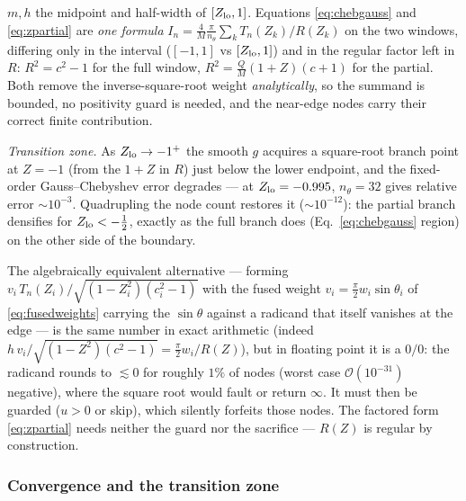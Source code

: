 \documentclass[11pt]{article}
\begin{document}
$m,h$ the midpoint and half-width of $[Z_{\rm lo},1]$.  Equations
\eqref{eq:chebgauss} and \eqref{eq:zpartial} are \emph{one formula}
$I_n=\tfrac{4}{M}\tfrac{\pi}{n_\theta}\sum_k T_n(Z_k)/R(Z_k)$ on the two
windows, differing only in the interval ($[-1,1]$ vs $[Z_{\rm lo},1]$) and in
the regular factor left in $R$: $R^{2}=c^{2}-1$ for the full window,
$R^{2}=\tfrac{Q}{M}(1+Z)(c+1)$ for the partial.  Both remove the
inverse-square-root weight \emph{analytically}, so the summand is bounded, no
positivity guard is needed, and the near-edge nodes carry their correct
finite contribution.

\emph{Transition zone.}  As $Z_{\rm lo}\to-1^{+}$ the smooth $g$ acquires a
square-root branch point at $Z=-1$ (from the $1+Z$ in $R$) just below the
lower endpoint, and the fixed-order Gauss--Chebyshev error degrades --- at
$Z_{\rm lo}=-0.995$, $n_\theta=32$ gives relative error $\sim10^{-3}$.
Quadrupling the node count restores it ($\sim10^{-12}$): the partial branch
densifies for $Z_{\rm lo}<-\tfrac12$, exactly as the full branch does
(Eq.~\ref{eq:chebgauss} region) on the other side of the boundary.

The algebraically equivalent alternative --- forming
$v_i\,T_n(Z_i)/\sqrt{(1-Z_i^{2})(c_i^{2}-1)}$ with the fused weight
$v_i=\tfrac\pi2 w_i\sin\theta_i$ of \eqref{eq:fusedweights} carrying the
$\sin\theta$ against a radicand that itself vanishes at the edge --- is the
same number in exact arithmetic (indeed $h\,v_i/\sqrt{(1-Z^2)(c^2-1)}
=\tfrac\pi2 w_i/R(Z)$), but in floating point it is a $0/0$: the radicand
rounds to $\lesssim0$ for roughly $1\%$ of nodes (worst case
$\mathcal{O}(10^{-31})$ negative), where the square root would fault or
return $\infty$.  It must then be guarded ($u>0$ or skip), which silently
forfeits those nodes.  The factored form \eqref{eq:zpartial} needs neither
the guard nor the sacrifice --- $R(Z)$ is regular by construction.

\subsubsection{Convergence and the transition zone}
\end{document}
